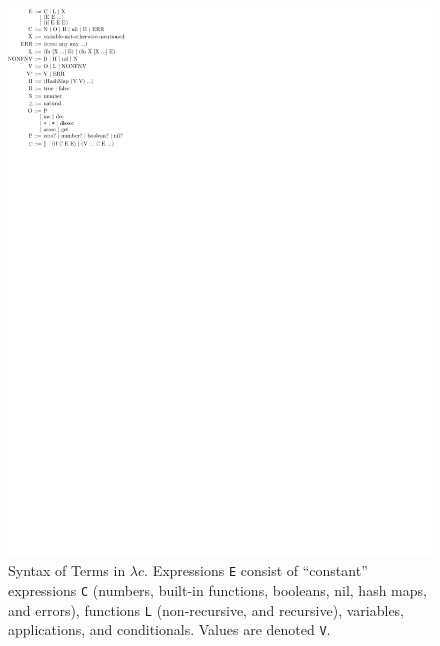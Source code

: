 \begin{figure}
  \includegraphics[]{redex/clojure-grammar.pdf}
\caption{Syntax of Terms in $\lambda c$.
  Expressions \texttt{E} consist of ``constant'' expressions \texttt{C}
  (numbers, built-in functions, booleans, nil, hash maps, and errors), 
  functions \texttt{L} (non-recursive, and recursive), variables, applications,
  and conditionals.
  Values are denoted \texttt{V}.
  }
\end{figure}

%

